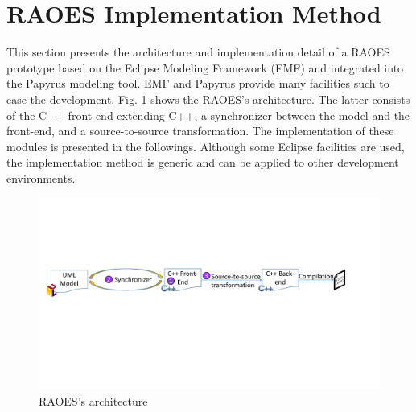 \section{RAOES Implementation Method}
\label{sec:implementation}
This section presents the architecture and implementation detail of a RAOES prototype based on the Eclipse Modeling Framework (EMF) and integrated into the Papyrus modeling tool.
EMF and Papyrus provide many facilities such to ease the development.
Fig. \ref{fig:architecture} shows the RAOES's architecture.
The latter consists of the C++ front-end extending C++, a synchronizer between the model and the front-end, and a source-to-source transformation.
The implementation of these modules is presented in the followings. 
Although some Eclipse facilities are used, the implementation method is generic and can be applied to other development environments.

\begin{figure}
	\centering
	\includegraphics[clip, trim=0.8cm 9.5cm 3.2cm 6.8cm, width=1.0\columnwidth]{figures/architecture.pdf}
	\caption{RAOES's architecture} 
	\label{fig:architecture}
\end{figure}

